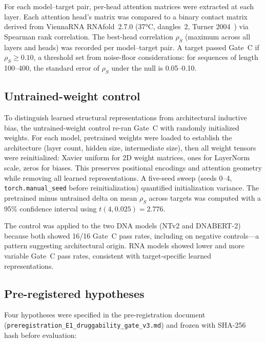 \documentclass[11pt]{article}
\begin{document}
For each model--target pair, per-head attention matrices were extracted at
each layer. Each attention head's matrix was compared to a binary contact
matrix derived from ViennaRNA RNAfold~2.7.0 (37°C, dangles~2, Turner
2004~\citep{lorenz2011}) via Spearman rank correlation. The best-head
correlation $\rho_S$ (maximum across all layers and heads) was recorded per
model--target pair. A target passed Gate~C if $\rho_S \geq 0.10$, a
threshold set from noise-floor considerations: for sequences of length
100--400, the standard error of $\rho_S$ under the null is 0.05--0.10.

\subsection{Untrained-weight control}

To distinguish learned structural representations from architectural
inductive bias, the untrained-weight control re-ran Gate~C with randomly
initialized weights. For each model, pretrained weights were loaded to
establish the architecture (layer count, hidden size, intermediate size),
then all weight tensors were reinitialized: Xavier uniform for 2D weight
matrices, ones for LayerNorm scale, zeros for biases. This preserves
positional encodings and attention geometry while removing all learned
representations. A five-seed sweep (seeds 0--4, \texttt{torch.manual\_seed}
before reinitialization) quantified initialization variance. The pretrained
minus untrained delta on mean $\rho_S$ across targets was computed with a
95\% confidence interval using $t(4, 0.025) = 2.776$.

The control was applied to the two DNA models (NTv2 and DNABERT-2) because
both showed 16/16 Gate~C pass rates, including on negative controls---a
pattern suggesting architectural origin. RNA models showed lower and more
variable Gate~C pass rates, consistent with target-specific learned
representations.

\subsection{Pre-registered hypotheses}

Four hypotheses were specified in the pre-registration document
(\texttt{preregistration\_E1\_druggability\_gate\_v3.md}) and frozen with
SHA-256 hash before evaluation:
\end{document}
